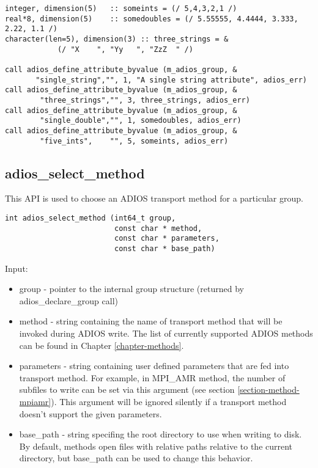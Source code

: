 \begin{lstlisting}[alsolanguage=Fortran,caption={},label={}]
integer, dimension(5)   :: someints = (/ 5,4,3,2,1 /)
real*8, dimension(5)    :: somedoubles = (/ 5.55555, 4.4444, 3.333, 2.22, 1.1 /)
character(len=5), dimension(3) :: three_strings = &
            (/ "X    ", "Yy   ", "ZzZ  " /)

call adios_define_attribute_byvalue (m_adios_group, &
       "single_string","", 1, "A single string attribute", adios_err)
call adios_define_attribute_byvalue (m_adios_group, &
        "three_strings","", 3, three_strings, adios_err)
call adios_define_attribute_byvalue (m_adios_group, &
        "single_double","", 1, somedoubles, adios_err)
call adios_define_attribute_byvalue (m_adios_group, &
        "five_ints",    "", 5, someints, adios_err)
\end{lstlisting}


\subsection{adios\_select\_method}
This API is used to choose an ADIOS transport method for a particular group. 

\begin{lstlisting}[alsolanguage=C,caption={},label={}]
int adios_select_method (int64_t group, 
                         const char * method,
                         const char * parameters,
                         const char * base_path)
\end{lstlisting}

Input:
\begin{itemize}
\item group - pointer to the internal group structure (returned by adios\_declare\_group 
call)

\item method - string containing the name of transport method that will be invoked during 
ADIOS write. The list of currently supported ADIOS methods can be found in Chapter 
\ref{chapter-methods}.

\item parameters - string containing user defined parameters that are fed into transport 
method.  For example, in MPI\_AMR method, the number of subfiles to write can be 
set via this argument (see section \ref{section-method-mpiamr}).
This argument will be ignored silently if a transport method doesn't support 
the given parameters.

\item base\_path -  string specifing the root directory to use when writing to disk. 
By default, methods open files with relative paths relative to the current directory, 
but base\_path can be used to change this behavior.
\end{itemize}

